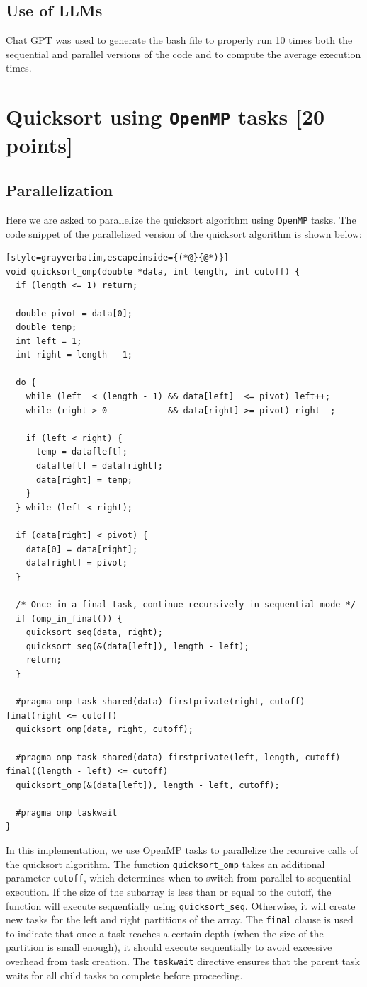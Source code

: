 \documentclass[unicode,10pt,a4paper,oneside,numbers=endperiod,openany]{scrartcl}
\begin{document}
\subsection{Use of LLMs}
Chat GPT was used to generate the bash file to properly run 10 times both the sequential and parallel versions of the code and to compute the average execution times.
\newpage
\section{Quicksort using \texttt{OpenMP} tasks [20 points]}
\subsection{Parallelization}
Here we are asked to parallelize the quicksort algorithm using \texttt{OpenMP} tasks. The code snippet of the parallelized version of the quicksort algorithm is shown below:
\begin{lstlisting}[style=grayverbatim,escapeinside={(*@}{@*)}]
void quicksort_omp(double *data, int length, int cutoff) {
  if (length <= 1) return;

  double pivot = data[0];
  double temp;
  int left = 1;
  int right = length - 1;

  do {
    while (left  < (length - 1) && data[left]  <= pivot) left++;
    while (right > 0            && data[right] >= pivot) right--;

    if (left < right) {
      temp = data[left];
      data[left] = data[right];
      data[right] = temp;
    }
  } while (left < right);

  if (data[right] < pivot) {
    data[0] = data[right];
    data[right] = pivot;
  }

  /* Once in a final task, continue recursively in sequential mode */
  if (omp_in_final()) {
    quicksort_seq(data, right);
    quicksort_seq(&(data[left]), length - left);
    return;
  }

  #pragma omp task shared(data) firstprivate(right, cutoff) final(right <= cutoff)
  quicksort_omp(data, right, cutoff);

  #pragma omp task shared(data) firstprivate(left, length, cutoff) final((length - left) <= cutoff)
  quicksort_omp(&(data[left]), length - left, cutoff);

  #pragma omp taskwait
}
\end{lstlisting}
In this implementation, we use OpenMP tasks to parallelize the recursive calls of the quicksort algorithm. The function \texttt{quicksort\_omp} takes an additional parameter \texttt{cutoff}, which determines when to switch from parallel to sequential execution. If the size of the subarray is less than or equal to the cutoff, the function will execute sequentially using \texttt{quicksort\_seq}. Otherwise, it will create new tasks for the left and right partitions of the array. The \texttt{final} clause is used to indicate that once a task reaches a certain depth (when the size of the partition is small enough), it should execute sequentially to avoid excessive overhead from task creation. The \texttt{taskwait} directive ensures that the parent task waits for all child tasks to complete before proceeding.
\end{document}
